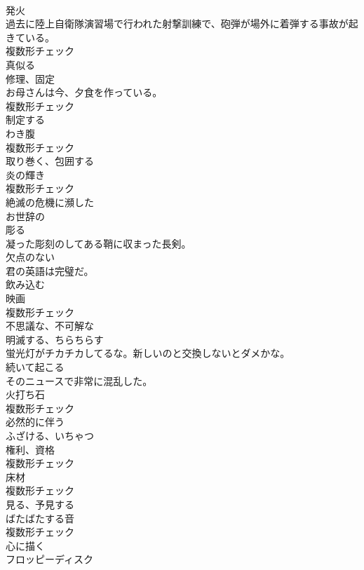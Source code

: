 \documentclass[8pt]{extreport}
\begin{document}
\begin{CJK}{UTF8}{min}
\\	[名詞]	発火	
\\	過去に陸上自衛隊演習場で行われた射撃訓練で、砲弾が場外に着弾する事故が起きている。	
\\	複数形チェック
\\	[動詞]	真似る	
\\	[名詞]	修理、固定	
\\	お母さんは今、夕食を作っている。	
\\	複数形チェック
\\	[動詞]	制定する	
\\	[名詞]	わき腹	
\\	複数形チェック
\\	[動詞]	取り巻く、包囲する	
\\	[名詞]	炎の輝き	
\\	複数形チェック
\\	[形容詞]	絶滅の危機に瀕した	
\\	[形容詞]	お世辞の	
\\	[動詞]	彫る	
\\	凝った彫刻のしてある鞘に収まった長剣。	
\\	[形容詞]	欠点のない	
\\	君の英語は完璧だ。	
\\	[動詞]	飲み込む	
\\	[名詞]	映画	
\\	複数形チェック
\\	[形容詞]	不思議な、不可解な	
\\	[動詞]	明滅する、ちらちらす	
\\	蛍光灯がチカチカしてるな。新しいのと交換しないとダメかな。	
\\	[動詞]	続いて起こる	
\\	そのニュースで非常に混乱した。	
\\	[名詞]	火打ち石	
\\	複数形チェック
\\	[動詞]	必然的に伴う	
\\	[動詞]	ふざける、いちゃつ	
\\	[名詞]	権利、資格	
\\	複数形チェック
\\	[名詞]	床材	
\\	複数形チェック
\\	[動詞]	見る、予見する	
\\	[名詞]	ばたばたする音	
\\	複数形チェック
\\	[動詞]	心に描く	
\\	[名詞]	フロッピーディスク	

\end{CJK}
\end{document}
